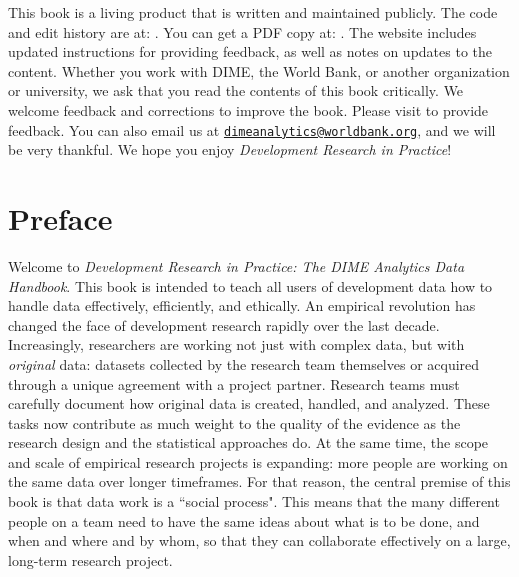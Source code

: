 \documentclass[]{tufte-book}
\begin{document}
This book is a living product that is written and maintained publicly.
The code and edit history are at:
\href{https://github.com/worldbank/dime-data-handbook}{}. You can get a
PDF copy at: \href{https://worldbank.github.com/dime-data-handbook}{}.
The website includes updated instructions for providing feedback, as
well as notes on updates to the content. Whether you work with DIME, the
World Bank, or another organization or university, we ask that you read
the contents of this book critically. We welcome feedback and
corrections to improve the book. Please visit
\href{https://worldbank.github.com/dime-data-handbook/feedback}{} to
provide feedback. You can also email us at
\href{mailto:dimeanalytics@worldbank.org}{\nolinkurl{dimeanalytics@worldbank.org}},
and we will be very thankful. We hope you enjoy \emph{Development
Research in Practice}!

\hypertarget{preface}{%
\chapter*{Preface}\label{preface}}

Welcome to \emph{Development Research in Practice: The DIME Analytics
Data Handbook}. This book is intended to teach all users of development
data how to handle data effectively, efficiently, and ethically. An
empirical revolution has changed the face of development research
rapidly over the last decade. Increasingly, researchers are working not
just with complex data, but with \emph{original} data: datasets
collected by the research team themselves or acquired through a unique
agreement with a project partner. Research teams must carefully document
how original data is created, handled, and analyzed. These tasks now
contribute as much weight to the quality of the evidence as the research
design and the statistical approaches do. At the same time, the scope
and scale of empirical research projects is expanding: more people are
working on the same data over longer timeframes. For that reason, the
central premise of this book is that data work is a ``social process".
This means that the many different people on a team need to have the
same ideas about what is to be done, and when and where and by whom, so
that they can collaborate effectively on a large, long-term research
project.
\end{document}
